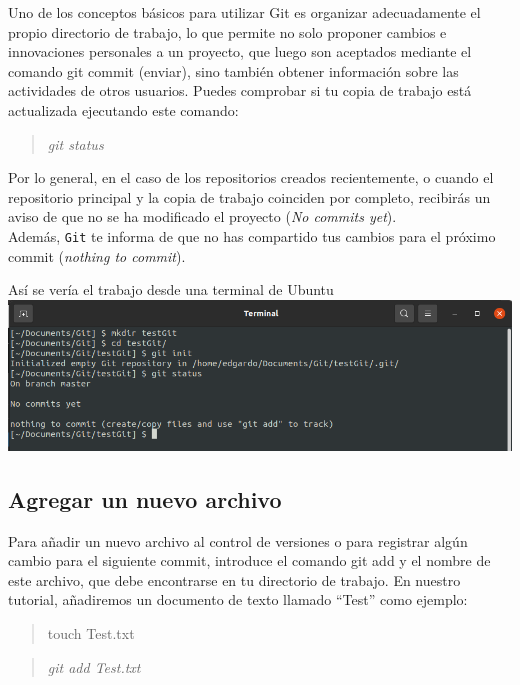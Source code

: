 \documentclass[11pt]{article}
\begin{document}
Uno de los conceptos básicos para utilizar Git es organizar
adecuadamente el propio directorio de trabajo, lo que permite no solo
proponer cambios e innovaciones personales a un proyecto, que luego son
aceptados mediante el comando git commit (enviar), sino también obtener
información sobre las actividades de otros usuarios. Puedes comprobar si
tu copia de trabajo está actualizada ejecutando este comando:

\begin{quote}
\emph{git status}
\end{quote}

Por lo general, en el caso de los repositorios creados recientemente, o
cuando el repositorio principal y la copia de trabajo coinciden por
completo, recibirás un aviso de que no se ha modificado el proyecto
(\emph{No commits yet}).\\
Además, \texttt{Git} te informa de que no has compartido tus cambios
para el próximo commit (\emph{nothing to commit}).

    Así se vería el trabajo desde una terminal de Ubuntu\\
\includegraphics{graphGit_01.png}

    \hypertarget{agregar-un-nuevo-archivo}{%
\subsection{Agregar un nuevo archivo}\label{agregar-un-nuevo-archivo}}

Para añadir un nuevo archivo al control de versiones o para registrar
algún cambio para el siguiente commit, introduce el comando git add y el
nombre de este archivo, que debe encontrarse en tu directorio de
trabajo. En nuestro tutorial, añadiremos un documento de texto llamado
``Test'' como ejemplo:

\begin{quote}
touch Test.txt
\end{quote}

\begin{quote}
\emph{git add Test.txt}
\end{quote}
\end{document}
